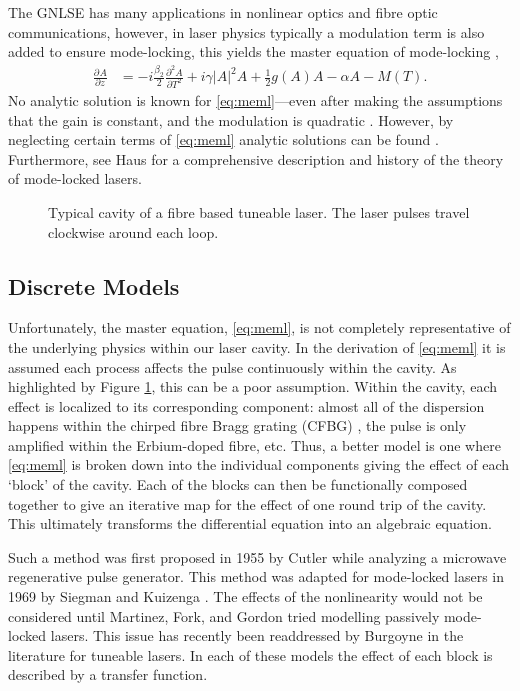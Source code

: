 \documentclass[10pt,twocolumn,a4paper]{article}
\newcommand{\pdiff}[3][]{\frac{\partial^{#1}#2}{\partial{#3}^{#1}}}
\begin{document}
The GNLSE has many applications in nonlinear optics and fibre optic communications, however, in laser physics typically a modulation term is also added to ensure mode-locking, this yields the master equation of mode-locking \cite{hausbook, haus1975, haus1986, haus1992, haus2000, tamura1996, usechak},
\begin{align}
	\pdiff{A}{z} &= - i \frac{\beta_2}{2}\pdiff[2]{A}{T} + i \gamma |A|^2 A + \frac{1}{2}g(A) A - \alpha A - M(T).
	\label{eq:meml}
\end{align}
No analytic solution is known for \eqref{eq:meml}---even after making the assumptions that the gain is constant, and the modulation is quadratic \cite{hausbook, haus1975, haus1996}. However, by neglecting certain terms of \eqref{eq:meml} analytic solutions can be found \cite{burgoyne2014, haus1975, haus1986, haus1991, haus1992, haus1996, tamura1996, usechak}. Furthermore, see Haus \cite{haus2000} for a comprehensive description and history of the theory of mode-locked lasers.

\begin{figure}[tbp]
	\centering
	
	\caption{Typical cavity of a fibre based tuneable laser. The laser pulses travel clockwise around each loop.}
	\label{fig:cavity}
\end{figure}

\subsection{Discrete Models}
\label{sec:discrete}
Unfortunately, the master equation, \eqref{eq:meml}, is not completely representative of the underlying physics within our laser cavity. In the derivation of \eqref{eq:meml} it is assumed each process affects the pulse continuously within the cavity. As highlighted by Figure \ref{fig:cavity}, this can be a poor assumption. Within the cavity, each effect is localized to its corresponding component: almost all of the dispersion happens within the chirped fibre Bragg grating (CFBG) \cite{agrawal2002}, the pulse is only amplified within the Erbium-doped fibre, etc. Thus, a better model is one where \eqref{eq:meml} is broken down into the individual components giving the effect of each `block' of the cavity. Each of the blocks can then be functionally composed together to give an iterative map for the effect of one round trip of the cavity. This ultimately transforms the differential equation into an algebraic equation.

Such a method was first proposed in 1955 by Cutler \cite{cutler} while analyzing a microwave regenerative pulse generator. This method was adapted for mode-locked lasers in 1969 by Siegman and Kuizenga \cite{kuizenga1970a, kuizenga1970b, kuizenga1970, siegman}. The effects of the nonlinearity would not be considered until Martinez, Fork, and Gordon \cite{martinez1984, martinez1985} tried modelling passively mode-locked lasers. This issue has recently been readdressed by Burgoyne \cite{burgoyne2014} in the literature for tuneable lasers. In each of these models the effect of each block is described by a transfer function.
\end{document}
